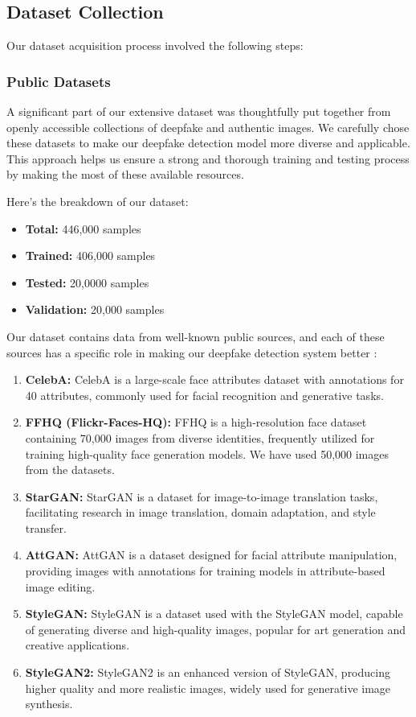 \subsection{Dataset Collection}

\noindent Our dataset acquisition process involved the following steps:


\subsubsection{Public Datasets}
A significant part of our extensive dataset was thoughtfully put together from openly accessible collections of deepfake and authentic images. We carefully chose these datasets to make our deepfake detection model more diverse and applicable. This approach helps us ensure a strong and thorough training and testing process by making the most of these available resources.

Here's the breakdown of our dataset:
\begin{itemize}
    \item \textbf{Total:} 446,000 samples
    \item \textbf{Trained:} 406,000 samples
    \item \textbf{Tested:} 20,0000 samples
    \item \textbf{Validation:} 20,000 samples
\end{itemize}
Our dataset contains data from well-known public sources, and each of these sources has a specific role in making our deepfake detection system better :

\begin{enumerate}
    \item \textbf{CelebA:} CelebA is a large-scale face attributes dataset with annotations for 40 attributes, commonly used for facial recognition and generative tasks.

    \item \textbf{FFHQ (Flickr-Faces-HQ):} FFHQ is a high-resolution face dataset containing 70,000 images from diverse identities, frequently utilized for training high-quality face generation models. We have used 50,000 images from the datasets.

    \item \textbf{StarGAN:} StarGAN is a dataset for image-to-image translation tasks, facilitating research in image translation, domain adaptation, and style transfer.

    \item \textbf{AttGAN:} AttGAN is a dataset designed for facial attribute manipulation, providing images with annotations for training models in attribute-based image editing.

    \item \textbf{StyleGAN:} StyleGAN is a dataset used with the StyleGAN model, capable of generating diverse and high-quality images, popular for art generation and creative applications.

    \item \textbf{StyleGAN2:} StyleGAN2 is an enhanced version of StyleGAN, producing higher quality and more realistic images, widely used for generative image synthesis.

\end{enumerate}


